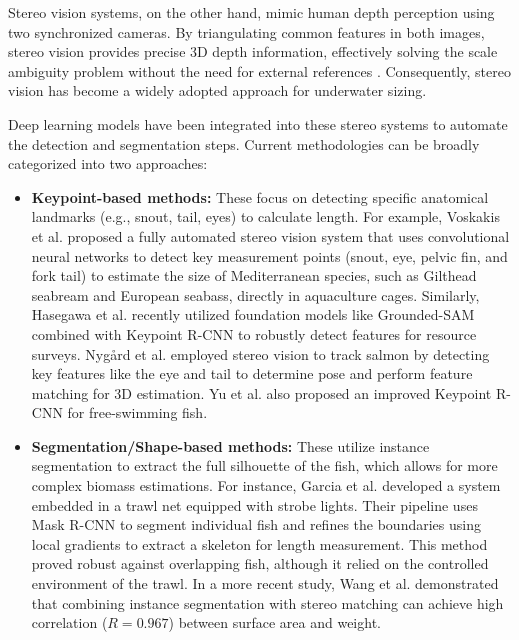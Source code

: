 \documentclass[utf8]{FrontiersinHarvard} %
\begin{document}
Stereo vision systems, on the other hand, mimic human depth perception using two synchronized cameras. By triangulating common features in both images, stereo vision provides precise 3D depth information, effectively solving the scale ambiguity problem without the need for external references \citep{Li2024}. Consequently, stereo vision has become a widely adopted approach for underwater sizing.

Deep learning models have been integrated into these stereo systems to automate the detection and segmentation steps. Current methodologies can be broadly categorized into two approaches: 

\begin{itemize}
    \item \textbf{Keypoint-based methods:} These focus on detecting specific anatomical landmarks (e.g., snout, tail, eyes) to calculate length. For example,  Voskakis et al. \citep{Voskakis2021} proposed a fully automated stereo vision system that uses convolutional neural networks to detect key measurement points (snout, eye, pelvic fin, and fork tail) to estimate the size of Mediterranean species, such as Gilthead seabream and European seabass, directly in aquaculture cages. Similarly, Hasegawa et al. \citep{Hasegawa2024} recently utilized foundation models like Grounded-SAM combined with Keypoint R-CNN to robustly detect features for resource surveys. Nygård et al. \citep{nygaard2022motion} employed stereo vision to track salmon by detecting key features like the eye and tail to determine pose and perform feature matching for 3D estimation. Yu et al. \citep{Yu2024} also proposed an improved Keypoint R-CNN for free-swimming fish.
    
    \item \textbf{Segmentation/Shape-based methods:} These utilize instance segmentation to extract the full silhouette of the fish, which allows for more complex biomass estimations. For instance, Garcia et al. \citep{Garcia2020} developed a system embedded in a trawl net equipped with strobe lights. Their pipeline uses Mask R-CNN to segment individual fish and refines the boundaries using local gradients to extract a skeleton for length measurement. This method proved robust against overlapping fish, although it relied on the controlled environment of the trawl. In a more recent study, Wang et al. \citep{Wang2025} demonstrated that combining instance segmentation with stereo matching can achieve high correlation ($R=0.967$) between surface area and weight.
\end{itemize}
\end{document}
